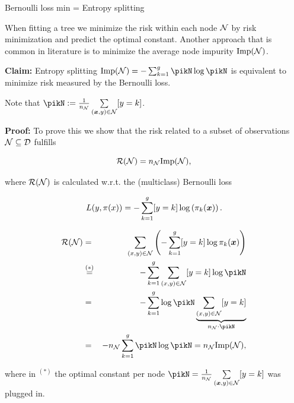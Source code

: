 \begin{vbframe}{Bernoulli loss min = Entropy splitting}

When fitting a tree we minimize the risk within each node $\mathcal{N}$ by risk minimization and predict the optimal constant. Another approach that is common in literature is to minimize the average node impurity $\text{Imp}(\mathcal{N})$. 

\vspace*{0.2cm}

\textbf{Claim:} Entropy splitting $\text{Imp}(\Np) = -\sum_{k = 1}^g \pikN \log \pikN$ is equivalent to minimize risk measured by the Bernoulli loss. 

\begin{footnotesize}
Note that $\pikN := \frac{1}{n_{\Np}} \sum\limits_{(\xv,y) \in \Np} [y = k]$. 
\end{footnotesize}

\vspace*{0.2cm}

\textbf{Proof: } To prove this we show that the risk related to a subset of observations $\mathcal{N} \subseteq \mathcal{D}$ fulfills 

\vspace*{- 0.2cm}


$$
  \mathcal{R}(\mathcal{N}) = n_{\mathcal{N}} \text{Imp}(\mathcal{N}),
$$
  
  where 
  $\mathcal{R}(\mathcal{N})$ is calculated w.r.t. the (multiclass) Bernoulli loss  

$$
  L(y, \pi(x)) = -\sum_{k = 1}^g [y = k] \log \left(\pi_k(\bm{x})\right).
$$

\framebreak 
\begin{footnotesize}
\begin{eqnarray*}
\risk(\Np) &=& \sum_{\xy \in \Np} \left(- \sum_{k = 1}^g [y = k] \log \pi_k(\xv) \right) \\
&\overset{(*)}{=}& -\sum_{k = 1}^g \sum_{\xy \in \Np} [y = k]\log \pikN \\
&=& -\sum_{k = 1}^g \log \pikN \underbrace{\sum_{\xy \in \Np} [y = k]}_{n_{\Np}\cdot \pikN } \\
 &=& -n_{\Np} \sum_{k = 1}^g \pikN \log \pikN = n_\Np \text{Imp}(\Np), 
\end{eqnarray*} 

where in $^{(*)}$ the optimal constant per node $\pikN = \frac{1}{n_{\Np}} \sum\limits_{(\xv,y) \in \Np} [y = k]$ was plugged in. 
\end{footnotesize}



\end{vbframe}
